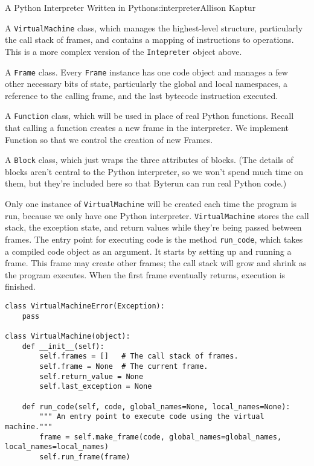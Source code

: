 \begin{aosachapter}{A Python Interpreter Written in Python}{s:interpreter}{Allison Kaptur}
\begin{aosaitemize}
\item
  A \texttt{VirtualMachine} class, which manages the highest-level
  structure, particularly the call stack of frames, and contains a
  mapping of instructions to operations. This is a more complex version
  of the \texttt{Intepreter} object above.
\item
  A \texttt{Frame} class. Every \texttt{Frame} instance has one code
  object and manages a few other necessary bits of state, particularly
  the global and local namespaces, a reference to the calling frame, and
  the last bytecode instruction executed.
\item
  A \texttt{Function} class, which will be used in place of real Python
  functions. Recall that calling a function creates a new frame in the
  interpreter. We implement Function so that we control the creation of
  new Frames.
\item
  A \texttt{Block} class, which just wraps the three attributes of
  blocks. (The details of blocks aren't central to the Python
  interpreter, so we won't spend much time on them, but they're included
  here so that Byterun can run real Python code.)
\end{aosaitemize}

\label{the-virtualmachine-class}

Only one instance of \texttt{VirtualMachine} will be created each time
the program is run, because we only have one Python interpreter.
\texttt{VirtualMachine} stores the call stack, the exception state, and
return values while they're being passed between frames. The entry point
for executing code is the method \texttt{run\_code}, which takes a
compiled code object as an argument. It starts by setting up and running
a frame. This frame may create other frames; the call stack will grow
and shrink as the program executes. When the first frame eventually
returns, execution is finished.

\begin{verbatim}
class VirtualMachineError(Exception):
    pass

class VirtualMachine(object):
    def __init__(self):
        self.frames = []   # The call stack of frames.
        self.frame = None  # The current frame.
        self.return_value = None
        self.last_exception = None

    def run_code(self, code, global_names=None, local_names=None):
        """ An entry point to execute code using the virtual machine."""
        frame = self.make_frame(code, global_names=global_names, local_names=local_names)
        self.run_frame(frame)
\end{verbatim}


\end{aosachapter}
